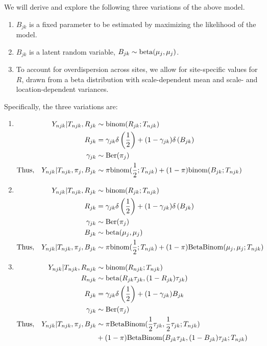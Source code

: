 \documentclass[reqno]{amsart}
\numberwithin{equation}{section}
\begin{document}
We will derive and explore the following three variations of the above model. 
\begin{enumerate}
    \item $B_{jk}$ is a fixed parameter to be estimated by maximizing the likelihood of the model.
    \item $B_{jk}$ is a latent random variable, $B_{jk} \sim \mathrm{beta}(\mu_j, \mu_j)$.
    \item To account for overdispersion across sites, we allow for site-specific values for $R$, drawn from a beta
    distribution with scale-dependent mean and scale- and location-dependent variances.
\end{enumerate}
Specifically, the three variations are: 
\begin{enumerate}
    \item $\begin{aligned}[t]
        Y_{njk} | T_{njk}, R_{jk} &\sim \mathrm{binom}(R_{jk}; T_{njk}) \\
        R_{jk} &= \gamma_{jk} \delta \left(\frac{1}{2} \right) + (1 - \gamma_{jk}) \delta \left(B_{jk} \right) \\
        \gamma_{jk} &\sim \mathrm{Ber}(\pi_j) \\
        \mathrm{Thus,} \quad Y_{njk} | T_{njk}, \pi_j, B_{jk} &\sim \pi \mathrm{binom}(\frac{1}{2}; T_{njk}) + (1-\pi) \mathrm{binom}(B_{jk}; T_{njk})
    \end{aligned}$
    \item $\begin{aligned}[t]
        Y_{njk} | T_{njk}, R_{jk} &\sim \mathrm{binom}(R_{jk}; T_{njk}) \\
        R_{jk} &= \gamma_{jk} \delta \left(\frac{1}{2} \right) + (1 - \gamma_{jk}) \delta \left(B_{jk} \right) \\
        \gamma_{jk} &\sim \mathrm{Ber}(\pi_j) \\
        B_{jk} &\sim \mathrm{beta}(\mu_j, \mu_j) \\
        \mathrm{Thus,} \quad Y_{njk} | T_{njk}, \pi_j, B_{jk} &\sim \pi \mathrm{binom}(\frac{1}{2}; T_{njk}) + (1-\pi) \mathrm{BetaBinom}(\mu_j, \mu_j; T_{njk})
    \end{aligned}$
    \item $\begin{aligned}[t]
        Y_{njk} | T_{njk}, R_{njk} &\sim \mathrm{binom}(R_{njk}; T_{njk}) \\
        R_{njk} &\sim \mathrm{beta}(R_{jk} \tau_{jk}, (1-R_{jk}) \tau_{jk}) \\
        R_{jk} &= \gamma_{jk} \delta \left(\frac{1}{2} \right) + (1 - \gamma_{jk}) B_{jk} \\
        \gamma_{jk} &\sim \mathrm{Ber}(\pi_j) \\
        \mathrm{Thus,} \quad Y_{njk} | T_{njk}, \pi_j, B_{jk} &\sim \pi \mathrm{BetaBinom}(\frac{1}{2} \tau_{jk}, \frac{1}{2} \tau_{jk}; T_{njk}) \\
            &+ (1-\pi) \mathrm{BetaBinom}(B_{jk}\tau_{jk}, (1-B_{jk})\tau_{jk}; T_{njk})
    \end{aligned}$
\end{enumerate}
\end{document}
